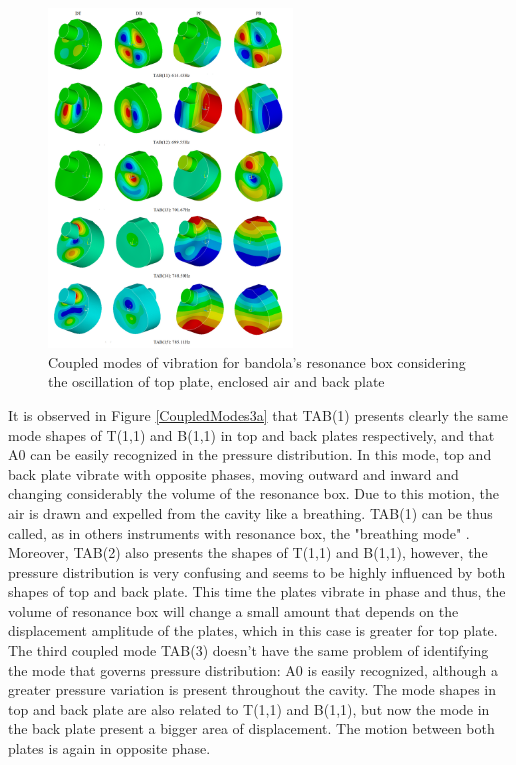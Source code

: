 \begin{figure}[h]
\centering
\includegraphics[height=9cm]{img/FSI3c.png}
\caption{Coupled modes of vibration for bandola's resonance box considering the oscillation of top plate, enclosed air and back plate}
\label{CoupledModes3c}
\end{figure}

It is observed in Figure \ref{CoupledModes3a} that TAB(1) presents clearly the same mode shapes of T(1,1) and B(1,1) in top and back plates respectively, and that A0 can be easily recognized in the pressure distribution. In this mode, top and back plate vibrate with opposite phases, moving outward and inward and changing considerably the volume of the resonance box. Due to this motion, the air is drawn and expelled from the cavity like a breathing. TAB(1) can be thus called, as in others instruments with resonance box, the "breathing mode" \cite{Pennstate}. Moreover, TAB(2) also presents the shapes of T(1,1) and B(1,1), however, the pressure distribution is very confusing and seems to be highly influenced by both shapes of top and back plate. This time the plates vibrate in phase and thus, the volume of resonance box will change a small amount that depends on the displacement amplitude of the plates, which in this case is greater for top plate. The third coupled mode TAB(3) doesn't have the same problem of identifying the mode that governs pressure distribution: A0 is easily recognized, although a greater pressure variation is present throughout the cavity. The mode shapes in top and back plate are also related to T(1,1) and B(1,1), but now the mode in the back plate present a bigger area of displacement. The motion between both plates is again in opposite phase.


